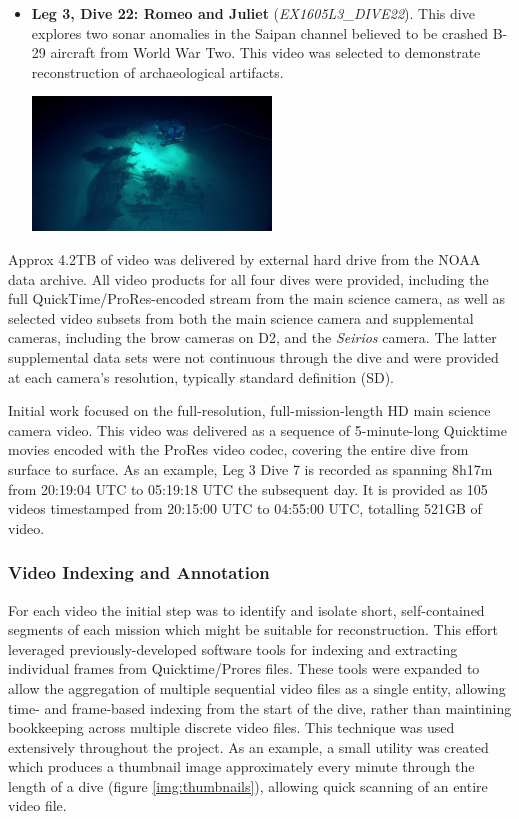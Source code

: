 \documentclass[letterpaper,12pt]{article}
\begin{document}
\begin{itemize}
    \item \textbf{Leg 3, Dive 22: Romeo and Juliet} (\textit{EX1605L3\_DIVE22}).  This dive explores two sonar anomalies in the Saipan channel believed to be crashed B-29 aircraft from World War Two.  This video was selected to demonstrate reconstruction of archaeological artifacts.
    
    \includegraphics[width=0.5\textwidth]{images/EX1605L3_DIVE22_highlight.jpg}
    
\end{itemize}

Approx 4.2TB of video was delivered by external hard drive from the NOAA data archive.  All video products for all four dives were provided, including the full QuickTime/ProRes-encoded stream from the main science camera, as well as selected video subsets from both the main science camera and supplemental cameras, including the brow cameras on D2, and the \textit{Seirios} camera.   The latter supplemental data sets were not continuous through the dive and were provided at each camera's resolution, typically standard definition (SD).  

Initial work focused on the full-resolution, full-mission-length HD main science camera video.  This video was delivered as a sequence of 5-minute-long Quicktime movies encoded with the ProRes video codec, covering the entire dive from surface to surface.    As an example, Leg 3 Dive 7 is recorded as spanning 8h17m from 20:19:04 UTC to 05:19:18 UTC the subsequent day.  It is provided as 105 videos timestamped from 20:15:00 UTC to 04:55:00 UTC, totalling 521GB of video. 

\subsubsection{Video Indexing and Annotation}

For each video the initial step was to identify and isolate short, self-contained segments of each mission which might be suitable for reconstruction.   This effort leveraged previously-developed software tools for indexing and extracting individual frames from Quicktime/Prores files.  These tools were expanded to allow the aggregation of multiple sequential video files as a single entity, allowing time- and frame-based indexing from the start of the dive, rather than maintining bookkeeping across multiple discrete video files.  This technique was used extensively throughout the project.  As an example, a small utility was created which produces a thumbnail image approximately every minute through the length of a dive (figure \ref{img:thumbnails}), allowing quick scanning of an entire video file.
\end{document}
